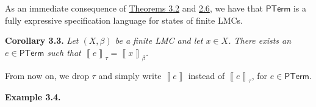 \par\medskip
\hypertarget{html:S3.SS0.SSS0.Px1.p5}{} As an immediate consequence of \hyperlink{html:S3.Thmtheorem2}{Theorems 3.2} and \hyperlink{html:S2.Thmtheorem6}{2.6}, we have that %
\hypertarget{html:S3.SS0.SSS0.Px1.p5.m1}{}\({\mathsf{PTerm}}\) is a fully expressive specification language for states of finite LMCs.
\par\medskip
\hypertarget{html:S3.Thmtheorem3}{} \par\noindent\textbf{\textbf{Corollary 3.3}\textbf{.}}\quad  %
\hypertarget{html:S3.Thmtheorem3.p1}{} \emph{Let %
\hypertarget{html:S3.Thmtheorem3.p1.m1}{}\({(X,\beta)}\) be a finite LMC and let %
\hypertarget{html:S3.Thmtheorem3.p1.m2}{}\({x\in X}\). There exists an %
\hypertarget{html:S3.Thmtheorem3.p1.m3}{}\({e\in\mathsf{PTerm}}\) such that %
\hypertarget{html:S3.Thmtheorem3.p1.m4}{}\({\left\llbracket{e}\right\rrbracket_{\tau}=\left\llbracket{x}\right\rrbracket_{\beta}}\).}
\par\medskip
\hypertarget{html:S3.SS0.SSS0.Px1.p6}{} From now on, we drop %
\hypertarget{html:S3.SS0.SSS0.Px1.p6.m1}{}\({\tau}\) and simply write %
\hypertarget{html:S3.SS0.SSS0.Px1.p6.m2}{}\({\left\llbracket{e}\right\rrbracket}\) instead of %
\hypertarget{html:S3.SS0.SSS0.Px1.p6.m3}{}\({\left\llbracket{e}\right\rrbracket_{\tau}}\), for %
\hypertarget{html:S3.SS0.SSS0.Px1.p6.m4}{}\({e\in\mathsf{PTerm}}\).
\par\medskip
\hypertarget{html:S3.Thmtheorem4}{} \par\noindent\textbf{\textbf{Example 3.4}\textbf{.}}\quad  %
